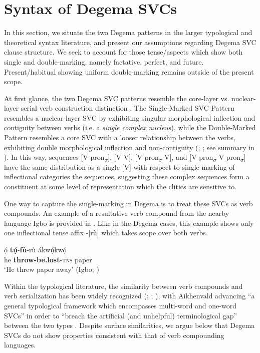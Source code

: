 \documentclass[output=paper]{langsci/langscibook}
\begin{document}
\section{Syntax of Degema SVCs}

In this section, we situate the two Degema patterns in the larger typological and theoretical syntax literature, and present our assumptions regarding Degema SVC clause structure. We seek to account for those tense/aspects which show both single and double-marking, namely factative, perfect, and future. Present/habitual showing uniform double-marking remains outside of the present scope. 

At first glance, the two Degema SVC patterns resemble the core-layer vs. nuclear-layer serial verb construction distinction \citep{FoleyOlson1985}. The Single-Marked SVC Pattern resembles a nuclear-layer SVC by exhibiting singular morphological inflection and contiguity between verbs (i.e. a \textit{single complex nucleus}), while the Double-Marked Pattern resembles a core SVC with a looser relationship between the verbs, exhibiting double morphological inflection and non-contiguity (\citealt[37--39]{FoleyOlson1985}; \citealt{Crowley2002}; see summary in \citealt[126-129]{ClearyKemp2015}). In this way, sequences [V pron\textsubscript{$\sigma $}], [V V], [V pron\textsubscript{$\sigma $} V], and [V pron\textsubscript{$\sigma $} V pron\textsubscript{$\sigma $}] have the same distribution as a single [V] with respect to single-marking of inflectional categories the sequences, suggesting these complex sequences form a constituent at some level of representation which the clitics are sensitive to. 

One way to capture the single-marking in Degema is to treat these SVCs as verb compounds. An example of a resultative verb compound from the nearby language Igbo is provided in . Like in the Degema cases, this example shows only one inflectional tense affix -[rù] which takes scope over both verbs.

\ea\label{ex:rolle:34}
\gll  ọ́    \textbf{tụ́}{}-\textbf{fù}{}-rù      ákwụ́kwọ́\\
     he  \textbf{throw-be.lost}{}-\textsc{tns}  paper\\
\glt ‘He threw paper away’ (Igbo; \citealt{Lord1975})
\z

Within the typological literature, the similarity between verb compounds and verb serialization has been widely recognized (\citealt[101]{Margetts1999}; \citealt[18]{Crowley2002}; \citealt[a.o.]{Aikhenvald2006}), with Aikhenvald advancing “a general typological framework which encompasses multi-word and one-word SVCs” in order to “breach the artificial (and unhelpful) terminological gap” between the two types \citep[38]{Aikhenvald2006}. Despite surface similarities, we argue below that Degema SVCs do not show properties consistent with that of verb compounding languages. 
\end{document}
